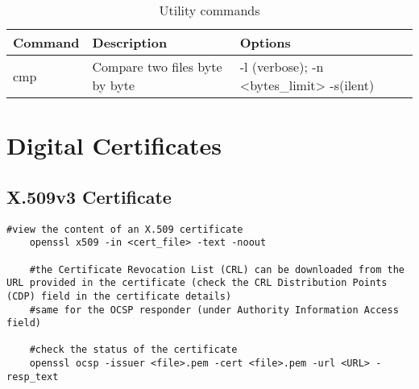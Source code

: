 \begin{table}[H]
	\centering
    \begin{tabular}{|p{6cm}|p{3cm}|p{7cm}|}\hline
        \rowcolor{gray!30}
		\textbf{Command} & \textbf{Description} & \textbf{Options} \\ \hline
        cmp 
			& Compare two files byte by byte
			& -l (verbose); -n <bytes\_limit>
                \newline -s(ilent)
        \\ \hline

    \end{tabular}

    \caption{Utility commands}

\end{table}

\section{Digital Certificates}
\subsection{X.509v3 Certificate}

\begin{lstlisting}[style=bashStyle]
    #view the content of an X.509 certificate
    openssl x509 -in <cert_file> -text -noout

    #the Certificate Revocation List (CRL) can be downloaded from the URL provided in the certificate (check the CRL Distribution Points (CDP) field in the certificate details)
    #same for the OCSP responder (under Authority Information Access field)

    #check the status of the certificate
    openssl ocsp -issuer <file>.pem -cert <file>.pem -url <URL> -resp_text
\end{lstlisting}